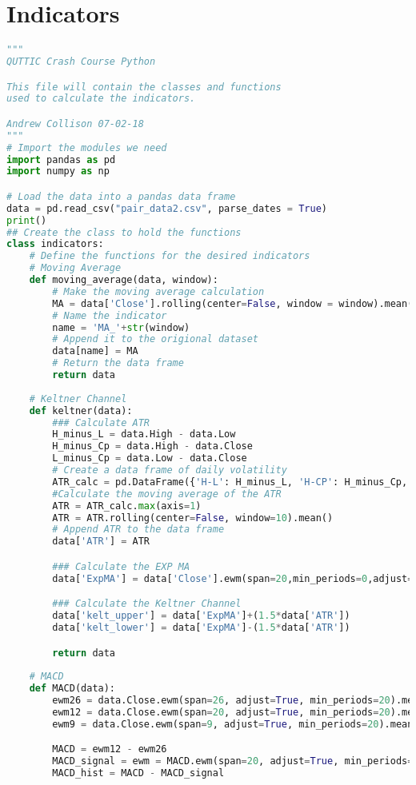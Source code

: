 \documentclass[11pt]{report}
\begin{document}
\section{Indicators}
\begin{lstlisting}[language = python]
"""
QUTTIC Crash Course Python 

This file will contain the classes and functions
used to calculate the indicators.

Andrew Collison 07-02-18
"""
# Import the modules we need
import pandas as pd
import numpy as np

# Load the data into a pandas data frame
data = pd.read_csv("pair_data2.csv", parse_dates = True)
print()
## Create the class to hold the functions
class indicators:
    # Define the functions for the desired indicators   
    # Moving Average
    def moving_average(data, window):
        # Make the moving average calculation
        MA = data['Close'].rolling(center=False, window = window).mean()
        # Name the indicator
        name = 'MA_'+str(window)
        # Append it to the origional dataset
        data[name] = MA
        # Return the data frame
        return data
    
    # Keltner Channel
    def keltner(data):
        ### Calculate ATR
        H_minus_L = data.High - data.Low
        H_minus_Cp = data.High - data.Close
        L_minus_Cp = data.Low - data.Close
        # Create a data frame of daily volatility
        ATR_calc = pd.DataFrame({'H-L': H_minus_L, 'H-CP': H_minus_Cp, 'L-CP': L_minus_Cp})
        #Calculate the moving average of the ATR
        ATR = ATR_calc.max(axis=1)
        ATR = ATR.rolling(center=False, window=10).mean()
        # Append ATR to the data frame
        data['ATR'] = ATR

        ### Calculate the EXP MA    
        data['ExpMA'] = data['Close'].ewm(span=20,min_periods=0,adjust=False,ignore_na=False).mean()

        ### Calculate the Keltner Channel
        data['kelt_upper'] = data['ExpMA']+(1.5*data['ATR'])
        data['kelt_lower'] = data['ExpMA']-(1.5*data['ATR'])

        return data
    
    # MACD
    def MACD(data):
        ewm26 = data.Close.ewm(span=26, adjust=True, min_periods=20).mean()
        ewm12 = data.Close.ewm(span=20, adjust=True, min_periods=20).mean()
        ewm9 = data.Close.ewm(span=9, adjust=True, min_periods=20).mean()

        MACD = ewm12 - ewm26
        MACD_signal = ewm = MACD.ewm(span=20, adjust=True, min_periods=20).mean()
        MACD_hist = MACD - MACD_signal



\end{lstlisting}
\end{document}
